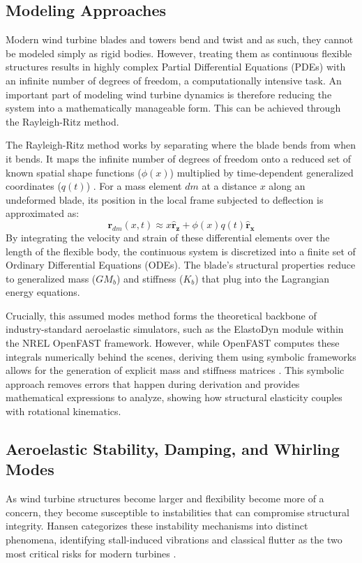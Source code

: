 \documentclass[final,onecolumn]{IEEEtran}
\begin{document}
\subsection{Modeling Approaches}
Modern wind turbine blades and towers bend and twist and as such,  they cannot be modeled simply as rigid bodies. However, treating them as continuous flexible structures results in highly complex Partial Differential Equations (PDEs) with an infinite number of degrees of freedom, a computationally intensive task. An important part of modeling wind turbine dynamics is therefore reducing the system into a mathematically manageable form. This can be achieved through the Rayleigh-Ritz method.

The Rayleigh-Ritz method works by separating where the blade bends from when it bends. It maps the infinite number of degrees of freedom onto a reduced set of known spatial shape functions ($\phi(x)$) multiplied by time-dependent generalized coordinates ($q(t)$) \cite{branlard2019flexible}. For a mass element $dm$ at a distance $x$ along an undeformed blade, its position in the local frame subjected to deflection is approximated as:
\begin{equation}
    \mathbf{r}_{dm}(x,t) \approx x \mathbf{\hat{r}_z} + \phi(x) q(t) \mathbf{\hat{r}_x}
\end{equation}
By integrating the velocity and strain of these differential elements over the length of the flexible body, the continuous system is discretized into a finite set of Ordinary Differential Equations (ODEs). The blade's structural properties reduce to generalized mass ($GM_b$) and stiffness ($K_b$) that plug into the Lagrangian energy equations.

Crucially, this assumed modes method forms the theoretical backbone of industry-standard aeroelastic simulators, such as the ElastoDyn module within the NREL OpenFAST framework. However, while OpenFAST computes these integrals numerically behind the scenes, deriving them using symbolic frameworks allows for the generation of explicit mass and stiffness matrices \cite{branlard2022symbolic}. This symbolic approach removes errors that happen during derivation and provides mathematical expressions to analyze, showing how structural elasticity couples with rotational kinematics.

\subsection{Aeroelastic Stability, Damping, and Whirling Modes}
As wind turbine structures become larger and flexibility become more of a concern, they become susceptible to instabilities that can compromise structural integrity. Hansen categorizes these instability mechanisms into distinct phenomena, identifying stall-induced vibrations and classical flutter as the two most critical risks for modern turbines \cite{hansen2007aeroelastic}.
\end{document}
